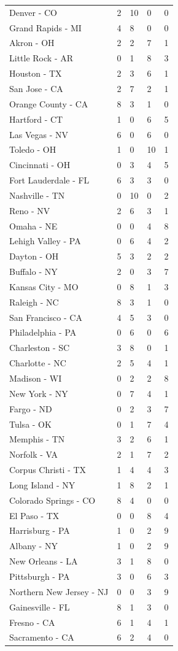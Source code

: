 \documentclass[sn-mathphys-num]{sn-jnl}%
\begin{document}
\begin{center}
\begin{longtable*}{|p{3.75cm}|p{2.5cm}|p{2.5cm}|p{2.5cm}|p{2.5cm}|}
		Denver - CO & 2 & 10 & 0 & 0 \\
		Grand Rapids - MI & 4 & 8 & 0 & 0 \\
		Akron - OH & 2 & 2 & 7 & 1 \\
		Little Rock - AR & 0 & 1 & 8 & 3 \\
		Houston - TX & 2 & 3 & 6 & 1 \\
		San Jose - CA & 2 & 7 & 2 & 1 \\
		Orange County - CA & 8 & 3 & 1 & 0 \\
		Hartford - CT & 1 & 0 & 6 & 5 \\
		Las Vegas - NV & 6 & 0 & 6 & 0 \\
		Toledo - OH & 1 & 0 & 10 & 1 \\
		Cincinnati - OH & 0 & 3 & 4 & 5 \\
		Fort Lauderdale - FL & 6 & 3 & 3 & 0 \\
		Nashville - TN & 0 & 10 & 0 & 2 \\
		Reno - NV & 2 & 6 & 3 & 1 \\
		Omaha - NE & 0 & 0 & 4 & 8 \\
		Lehigh Valley - PA & 0 & 6 & 4 & 2 \\
		Dayton - OH & 5 & 3 & 2 & 2 \\
		Buffalo - NY & 2 & 0 & 3 & 7 \\
		Kansas City - MO & 0 & 8 & 1 & 3 \\
		Raleigh - NC & 8 & 3 & 1 & 0 \\
		San Francisco - CA & 4 & 5 & 3 & 0 \\
		Philadelphia - PA & 0 & 6 & 0 & 6 \\
		Charleston - SC & 3 & 8 & 0 & 1 \\
		Charlotte - NC & 2 & 5 & 4 & 1 \\
		Madison - WI & 0 & 2 & 2 & 8 \\
		New York - NY & 0 & 7 & 4 & 1 \\
		Fargo - ND & 0 & 2 & 3 & 7 \\
		Tulsa - OK & 0 & 1 & 7 & 4 \\
		Memphis - TN & 3 & 2 & 6 & 1 \\
		Norfolk - VA & 2 & 1 & 7 & 2 \\
		Corpus Christi - TX & 1 & 4 & 4 & 3 \\
		Long Island - NY & 1 & 8 & 2 & 1 \\
		Colorado Springs - CO & 8 & 4 & 0 & 0 \\
		El Paso - TX & 0 & 0 & 8 & 4 \\
		Harrisburg - PA & 1 & 0 & 2 & 9 \\
		Albany - NY & 1 & 0 & 2 & 9 \\
		New Orleans - LA & 3 & 1 & 8 & 0 \\
		Pittsburgh - PA & 3 & 0 & 6 & 3 \\
		Northern New Jersey - NJ & 0 & 0 & 3 & 9 \\
		Gainesville - FL & 8 & 1 & 3 & 0 \\
		Fresno - CA & 6 & 1 & 4 & 1 \\
		Sacramento - CA & 6 & 2 & 4 & 0
	\end{longtable*}
	

\end{center}
\end{document}
